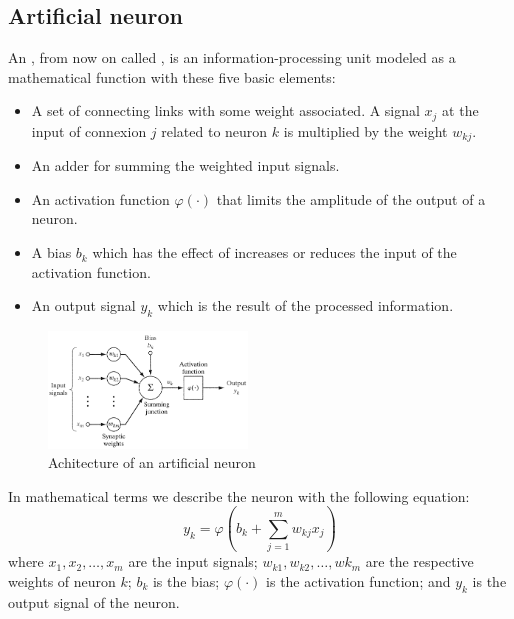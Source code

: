 \subsection{Artificial neuron}
An , from now on called , is an
information-processing unit modeled as a mathematical
function with these five basic elements:
\begin{itemize}
    \item A set of connecting links with some weight associated.
    A signal $x_j$ at the input of connexion $j$ related to neuron $k$ is multiplied by the weight $w_{kj}$.
    \item An adder for summing the weighted input signals.
    \item An activation function $\varphi(\cdot)$ that limits the amplitude of the output of a neuron.
    \item A bias $b_k$ which has the effect of increases or reduces the input of the activation function.
    \item An output signal $y_k$ which is the result of the processed information.
\end{itemize}

\begin{figure}[hbtp]
\begin{center}
\includegraphics[width=200]{img/artificial_neuron.png}
\end{center}
\caption[Artificial neuron diagram]
{Achitecture of an artificial neuron}
\label{fig:AN}
\end{figure}

In mathematical terms we describe the neuron with the following equation:
\begin{equation}
    y_k=\varphi(b_k+\sum\limits_{j=1}^m w_{kj} x_j)
\end{equation}
where $x_1, x_2, \dots, x_m$ are the input signals;
$w_{k1}, w_{k2}, \dots, wk_m$ are the respective weights of neuron $k$;
$b_k$ is the bias;
$\varphi(\cdot)$ is the activation function;
and $y_k$ is the output signal of the neuron.

